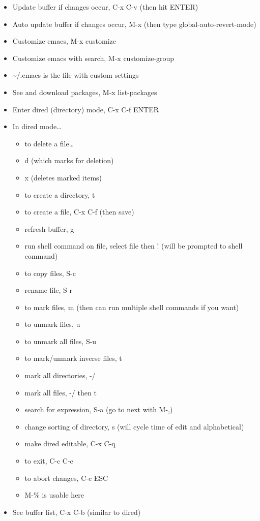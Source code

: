 \documentclass[11pt]{article}
\begin{document}
\begin{itemize}
\item Update buffer if changes occur, C-x C-v (then hit ENTER)
\item Auto update buffer if changes occur, M-x (then type global-auto-revert-mode)
\item Customize emacs, M-x customize
\item Customize emacs with search, M-x customize-group
\item \textasciitilde{}/.emacs is the file with custom settings
\item See and download packages, M-x list-packages
\item Enter dired (directory) mode, C-x C-f ENTER
\item In dired mode\ldots{}
\begin{itemize}
\item to delete a file\ldots{}
\item d (which marks for deletion)
\item x (deletes marked items)
\item to create a directory, t
\item to create a file, C-x C-f (then save)
\item refresh buffer, g
\item run shell command on file, select file then ! (will be prompted to shell command)
\item to copy files, S-c
\item rename file, S-r
\item to mark files, m (then can run multiple shell commands if you want)
\item to unmark files, u
\item to unmark all files, S-u
\item to mark/unmark inverse files, t
\item mark all directories, -/
\item mark all files, -/ then t
\item search for expression, S-a (go to next with M-,)
\item change sorting of directory, s (will cycle time of edit and alphabetical)
\item make dired editable, C-x C-q
\item to exit, C-c C-c
\item to abort changes, C-c ESC
\item M-\% is usable here
\end{itemize}
\item See buffer list, C-x C-b (similar to dired)

\end{itemize}
\end{document}
